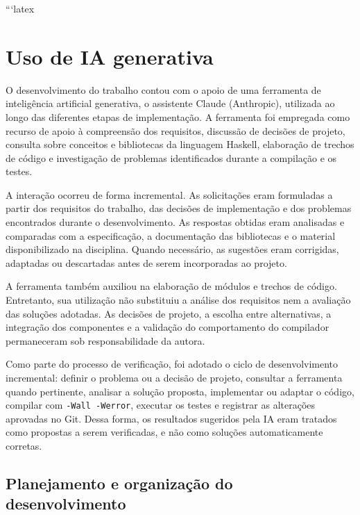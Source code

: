 ```latex

\section{Uso de IA generativa}
\label{sec:ia}

O desenvolvimento do trabalho contou com o apoio de uma ferramenta
de inteligência artificial generativa, o assistente Claude
(Anthropic), utilizada ao longo das diferentes etapas de implementação.
A ferramenta foi empregada como recurso de apoio à compreensão dos
requisitos, discussão de decisões de projeto, consulta sobre conceitos
e bibliotecas da linguagem Haskell, elaboração de trechos de código
e investigação de problemas identificados durante a compilação e os
testes.

A interação ocorreu de forma incremental. As solicitações eram
formuladas a partir dos requisitos do trabalho, das decisões de
implementação e dos problemas encontrados durante o desenvolvimento.
As respostas obtidas eram analisadas e comparadas com a especificação,
a documentação das bibliotecas e o material disponibilizado na
disciplina. Quando necessário, as sugestões eram corrigidas, adaptadas
ou descartadas antes de serem incorporadas ao projeto.

A ferramenta também auxiliou na elaboração de módulos e trechos de
código. Entretanto, sua utilização não substituiu a análise dos
requisitos nem a avaliação das soluções adotadas. As decisões de
projeto, a escolha entre alternativas, a integração dos componentes
e a validação do comportamento do compilador permaneceram sob
responsabilidade da autora.

Como parte do processo de verificação, foi adotado o ciclo de
desenvolvimento incremental: definir o problema ou a decisão de
projeto, consultar a ferramenta quando pertinente, analisar a solução
proposta, implementar ou adaptar o código, compilar com
\texttt{-Wall -Werror}, executar os testes e registrar as alterações
aprovadas no Git. Dessa forma, os resultados sugeridos pela IA eram
tratados como propostas a serem verificadas, e não como soluções
automaticamente corretas.

\subsection{Planejamento e organização do desenvolvimento}

